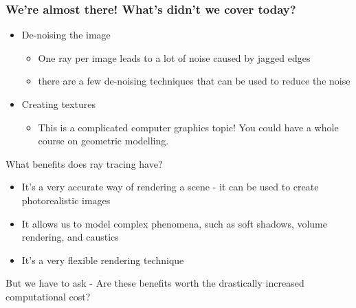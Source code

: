 \documentclass[12pt]{beamer}
\begin{document}
  \begin{frame}
    \frametitle{We're almost there! What's didn't we cover today?}

    \begin{itemize}

      \item De-noising the image

      \begin{itemize}
        \item One ray per image leads to a lot of noise caused by jagged edges
        \item there are a few de-noising techniques that can be used to reduce the noise
      \end{itemize}

      \item Creating textures

      \begin{itemize}
        \item This is a complicated computer graphics topic!
        You could have a whole course on geometric modelling.
      \end{itemize}

    \end{itemize}

  \end{frame}

  \begin{frame}{What benefits does ray tracing have?}

    \begin{itemize}
      \item It's a very accurate way of rendering a scene - it can be used to create photorealistic images
      \item It allows us to model complex phenomena, such as soft shadows, volume rendering, and caustics
      \item It's a very flexible rendering technique %
    \end{itemize}

    But we have to ask - Are these benefits worth the drastically increased computational cost?
  \end{frame}
\end{document}
